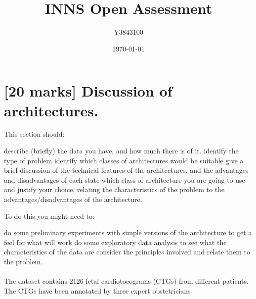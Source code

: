 \documentclass[11pt,a4paper]{article}
\title{INNS Open Assessment}
\author{Y3843100}
\date{\today}
\begin{document}


\maketitle


\section{[20 marks] Discussion of architectures.}

This section should:
\begin{outline}
  \1 describe (briefly) the data you have, and how much there is of it.
  \1 identify the type of problem
  \1 identify which classes of architectures would be suitable
  \1 give a brief discussion of the technical features of the architectures, and the advantages and disadvantages of each
  \1 state which class of architecture you are going to use and justify your choice, relating the characteristics of the problem to the advantages/disadvantages of the architecture.
\end{outline}

To do this you might need to:
\begin{outline}
  \1 do some preliminary experiments with simple versions of the architecture to get a feel for what will work
  \1 do some exploratory data analysis to see what the characteristics of the data are
  \1 consider the principles involved and relate them to the problem.
\end{outline}

\paragraph{}
The dataset contains 2126 fetal cardiotocograms (CTGs) from different patients. The CTGs have been annotated by three expert obstetricians \autocite{Campos:2000}
\end{document}
